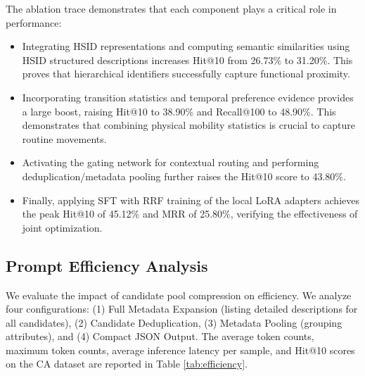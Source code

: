 \documentclass[10pt,twocolumn]{article}
\begin{document}
The ablation trace demonstrates that each component plays a critical role in performance:
\begin{itemize}
    \item Integrating HSID representations and computing semantic similarities using HSID structured descriptions increases Hit@10 from 26.73\% to 31.20\%. This proves that hierarchical identifiers successfully capture functional proximity.
    \item Incorporating transition statistics and temporal preference evidence provides a large boost, raising Hit@10 to 38.90\% and Recall@100 to 48.90\%. This demonstrates that combining physical mobility statistics is crucial to capture routine movements.
    \item Activating the gating network for contextual routing and performing deduplication/metadata pooling further raises the Hit@10 score to 43.80\%.
    \item Finally, applying SFT with RRF training of the local LoRA adapters achieves the peak Hit@10 of 45.12\% and MRR of 25.80\%, verifying the effectiveness of joint optimization.
\end{itemize}

\subsection{Prompt Efficiency Analysis}
We evaluate the impact of candidate pool compression on efficiency. We analyze four configurations: (1) Full Metadata Expansion (listing detailed descriptions for all candidates), (2) Candidate Deduplication, (3) Metadata Pooling (grouping attributes), and (4) Compact JSON Output. The average token counts, maximum token counts, average inference latency per sample, and Hit@10 scores on the CA dataset are reported in Table \ref{tab:efficiency}.

\begin{table}[h]
\centering
\caption{Prompt Efficiency Analysis (CA Dataset).}
\label{tab:efficiency}
\small
\noindent{}
\end{table}
\end{document}
